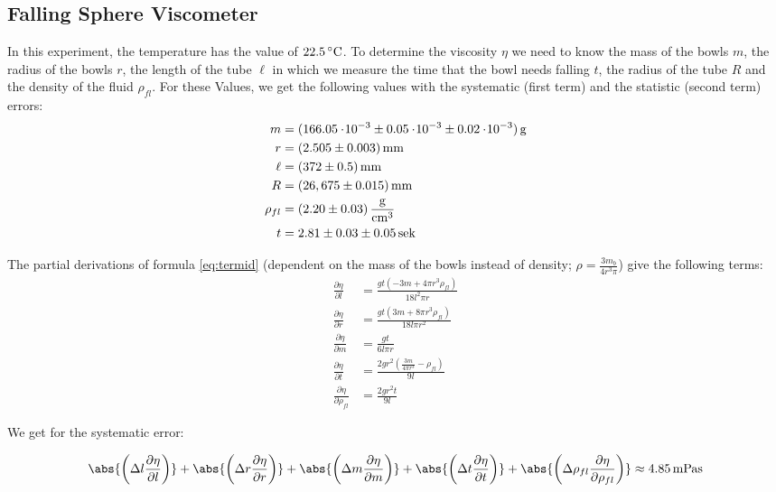 \subsection{Falling Sphere Viscometer}
In this experiment, the temperature has the value of $22.5\C$. To determine the viscosity $\eta$ we need to know the mass of the bowls $m$, the radius of the bowls $r$, the length of the tube $\ell$ in which we measure the time that the bowl needs falling $t$, the radius of the tube $R$ and the density of the fluid $\rho_{fl}$. For these Values, we get the following values with the systematic (first term) and the statistic (second term) errors:
\begin{align*}
m &= \unit[(166.05\e{-3} \pm 0.05\e{-3} \pm 0.02 \e{-3})]{g}\\
r &= \unit[(2.505 \pm 0.003)]{mm}\\
\ell &= \unit[(372 \pm 0.5)]{mm}\\
R &= \unit[(26,675 \pm 0.015)]{mm}\\
\rho_{fl} &= \unit[(2.20 \pm 0.03)]{\frac{g}{cm^3}}\\
t &= \unit[2.81 \pm 0.03 \pm 0.05]{sek}
\end{align*}





The partial derivations of formula \ref{eq:termid} (dependent on the mass of the bowls instead of density; $\rho = \frac{3m_b}{4r^3\pi}$) give the following terms:
\begin{align*}
\frac{\partial \eta}{\partial l}  &= \frac{g t \left(-3 m+4 \pi  r^3 \rho_{fl}\right)}{18 l^2 \pi  r}\\
\frac{\partial \eta}{\partial r} &= \frac{g t \left(3 m+8 \pi  r^3 \rho_{fl}\right)}{18 l \pi  r^2}\\
\frac{\partial \eta}{\partial m} &= \frac{g t}{6 l \pi  r}\\
\frac{\partial \eta}{\partial t} &= \frac{2 g r^2 \left(\frac{3 m}{4 \pi  r^3}- \rho_{fl}\right)}{9 l}\\
\frac{\partial \eta}{\partial \rho_{fl}} &= \frac{2 g r^2 t}{9 l}
\end{align*}

We get for the systematic error:

\begin{equation}
\abs{\left(\Delta l\frac{\partial \eta}{\partial l}\right)}
+
\abs{\left(\Delta r\frac{\partial \eta}{\partial r}\right)}
+
\abs{\left(\Delta m\frac{\partial \eta}{\partial m}\right)}
+
\abs{\left(\Delta t\frac{\partial \eta}{\partial t}\right)}
+
\abs{\left(\Delta \rho_{fl}\frac{\partial \eta}{\partial \rho_{fl}}\right)}
\approx \unit[4.85]{mPa s}
\end{equation}

